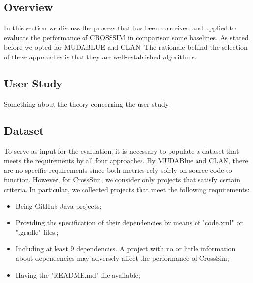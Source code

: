 \subsection{Overview}
In this section we discuss the process that has been conceived and applied to evaluate the
performance of CROSSSIM in comparison some baselines. As stated before we opted for MUDABLUE and
CLAN. The rationale behind the selection of these approaches is that they are well-established algorithms.
\subsection{User Study}
Something about the theory concerning the user study.
\subsection{Dataset}


To serve as input for the evaluation, it is necessary to populate a dataset that meets the requirements by all four approaches. By MUDABlue and CLAN, there are no specific requirements since both metrics rely solely on source code to function. However, for CrossSim, we consider only projects that satisfy certain criteria. In particular, we collected projects that meet the following requirements:

\begin{itemize}
	\item Being GitHub Java projects; 
	\item Providing the specification of their dependencies by means of "code.xml" or ".gradle" files.;
	\item Including at least $9$ dependencies. A project with no or little information about dependencies may adversely affect the performance of CrossSim; 
	\item Having the "README.md" file available; 
\end{itemize}

